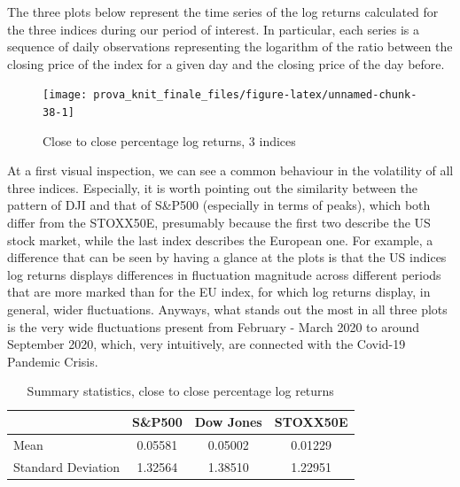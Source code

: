 \documentclass[
]{book}
\theoremstyle{break}
\theoremstyle{nonumberplain}
\begin{document}
The three plots below represent the time series of the log returns
calculated for the three indices during our period of interest. In
particular, each series is a sequence of daily observations representing
the logarithm of the ratio between the closing price of the index for a
given day and the closing price of the day before.

\begin{figure}[H]

{\centering \texttt{[image: prova\_knit\_finale\_files/figure-latex/unnamed-chunk-38-1]} 

}

\caption{Close to close percentage log returns, 3 indices}\label{fig:unnamed-chunk-38}
\end{figure}

At a first visual inspection, we can see a common behaviour in the
volatility of all three indices. Especially, it is worth pointing out
the similarity between the pattern of DJI and that of S\&P500
(especially in terms of peaks), which both differ from the STOXX50E,
presumably because the first two describe the US stock market, while the
last index describes the European one. For example, a difference that
can be seen by having a glance at the plots is that the US indices log
returns displays differences in fluctuation magnitude across different
periods that are more marked than for the EU index, for which log
returns display, in general, wider fluctuations. Anyways, what stands
out the most in all three plots is the very wide fluctuations present
from February - March 2020 to around September 2020, which, very
intuitively, are connected with the Covid-19 Pandemic Crisis.

\begin{longtable}[t]{lccc}
\caption{\label{tab:unnamed-chunk-39}Summary statistics, close to close percentage log returns}\\
\toprule
  & S\&P500 & Dow Jones & STOXX50E\\
\midrule
Mean & 0.05581 & 0.05002 & 0.01229\\
Standard Deviation & 1.32564 & 1.38510 & 1.22951\\
\bottomrule
\end{longtable}
\end{document}
